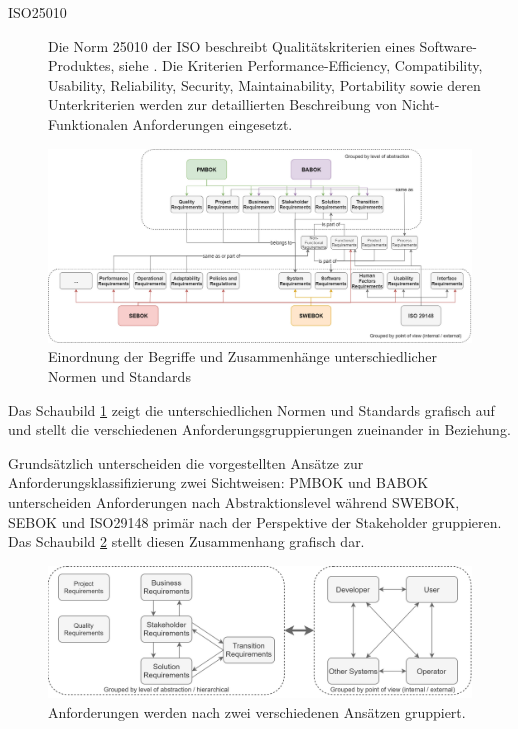 \begin{description}
  \item[ISO25010] Die Norm 25010 der \ac{ISO} beschreibt Qualitätskriterien eines Software-Produktes, siehe \cite{ISO25010}. Die Kriterien Performance-Efficiency, Compatibility, Usability, Reliability, Security, Maintainability, Portability sowie deren Unterkriterien werden zur detaillierten Beschreibung von Nicht-Funktionalen Anforderungen eingesetzt.
\end{description}

\begin{figure}[htbp]
 \centering
 \includegraphics[width=1.0\textwidth]{gfx/Requirements.png}
 \caption{Einordnung der Begriffe und Zusammenhänge unterschiedlicher Normen und Standards}
 \label{fig:chapter05:requirements}
\end{figure}

Das Schaubild \ref{fig:chapter05:requirements} zeigt die unterschiedlichen Normen und Standards grafisch auf und stellt die verschiedenen Anforderungsgruppierungen zueinander in Beziehung.

Grundsätzlich unterscheiden die vorgestellten Ansätze zur Anforderungsklassifizierung zwei Sichtweisen: \ac{PMBOK} und \ac{BABOK} unterscheiden Anforderungen nach Abstraktionslevel während \ac{SWEBOK}, \ac{SEBOK} und ISO29148 primär nach der Perspektive der Stakeholder gruppieren. Das Schaubild \ref{fig:chapter05:requirements_grouping} stellt diesen Zusammenhang grafisch dar.

\begin{figure}[htbp]
 \centering
 \includegraphics[width=1.0\textwidth]{gfx/Requirements_Grouping.png}
 \caption{Anforderungen werden nach zwei verschiedenen Ansätzen gruppiert.}
 \label{fig:chapter05:requirements_grouping}
\end{figure}

